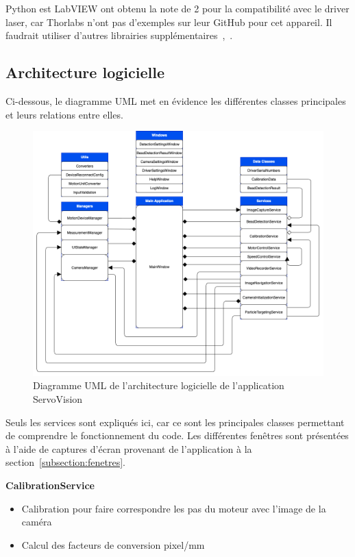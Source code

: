 Python est LabVIEW ont obtenu la note de 2 pour la compatibilité avec le driver laser, car Thorlabs n'ont pas d'exemples sur leur GitHub pour cet appareil. Il faudrait utiliser d'autres librairies supplémentaires~\cite{controlLaserDriverPython},~\cite{controlLaserDriverLabVIEW}.

\newpage
\subsection{Architecture logicielle}
Ci-dessous, le diagramme UML met en évidence les différentes classes principales et leurs relations entre elles.
\begin{figure}[H]
    \centering
    \includegraphics[width=\textwidth]{assets/figures/Application_ServoVision/ServoVision_UML_Diagram.drawio.png}
    \caption{Diagramme UML de l'architecture logicielle de l'application ServoVision}
    \label{uml_servovision}
\end{figure}

Seuls les services sont expliqués ici, car ce sont les principales classes permettant de comprendre le fonctionnement du code. Les différentes fenêtres sont présentées à l'aide de captures d'écran provenant de l'application à la section~\ref{subsection:fenetres}.

\textbf{CalibrationService}
\begin{itemize}[label=\textbullet]
    \item Calibration pour faire correspondre les pas du moteur avec l'image de la caméra
    \item Calcul des facteurs de conversion pixel/mm
\end{itemize}

